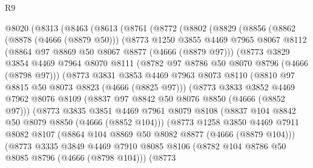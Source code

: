 \begin{lexlean}{R9}
\begin{coremodule}
  @8020
    (@8313
      (@8463
        (@8613
          (@8761
            (@8772
              (@8802
                (@8829
                  (@8856
                    (@8862
                      (@8878 (@4666 (@8879 @50)))
                      (@8773
                        @1250
                        @3855
                        @4469
                        @7965
                        @8067
                        @8112
                        (@8864 @97 @8869 @50 @8067 @8877 (@4666 (@8879 @97)))
                        (@8773
                          @3829
                          @3854
                          @4469
                          @7964
                          @8070
                          @8111
                          (@8782 @97 @8786 @50 @8070 @8796 (@4666 (@8798 @97)))
                          (@8773
                            @3831
                            @3853
                            @4469
                            @7963
                            @8073
                            @8110
                            (@8810 @97 @8815 @50 @8073 @8823 (@4666 (@8825 @97)))
                            (@8773
                              @3833
                              @3852
                              @4469
                              @7962
                              @8076
                              @8109
                              (@8837 @97 @8842 @50 @8076 @8850 (@4666 (@8852 @97)))
                              (@8773
                                @3835
                                @3851
                                @4469
                                @7961
                                @8079
                                @8108
                                (@8837 @104 @8842 @50 @8079 @8850 (@4666 (@8852 @104)))
                                (@8773
                                  @1258
                                  @3850
                                  @4469
                                  @7911
                                  @8082
                                  @8107
                                  (@8864 @104 @8869 @50 @8082 @8877 (@4666 (@8879 @104)))
                                  (@8773
                                    @3335
                                    @3849
                                    @4469
                                    @7910
                                    @8085
                                    @8106
                                    (@8782 @104 @8786 @50 @8085 @8796 (@4666 (@8798 @104)))
                                    (@8773

\end{coremodule}
\end{lexlean}
